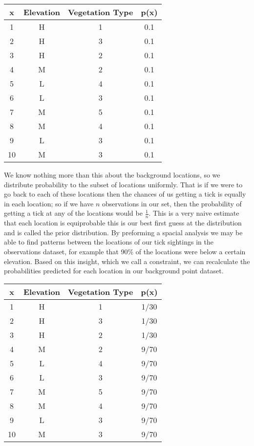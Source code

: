 \begin{center}
 \begin{tabular}{||c c c c||} 
 \hline
 x & Elevation & Vegetation Type & p(x) \\ [0.5ex] 
 \hline\hline
 1 & H &  1& 0.1  \\ 
 \hline
  2 & H & 3 & 0.1\\
 \hline
   3 & H & 2 & 0.1\\
 \hline
 4 & M & 2 & 0.1  \\
 \hline
  5 & L & 4 & 0.1 \\
 \hline
   6 & L & 3 & 0.1\\
 \hline
  7 & M & 5 & 0.1 \\
 \hline
   8 & M & 4 & 0.1\\
 \hline
 9 & L & 3 & 0.1 \\
 \hline
   10 & M & 3 & 0.1\\
 \hline
\end{tabular}
\end{center}




\noindent We know nothing more than this about the background locations, so we distribute probability to the subset of locations uniformly. That is if we were to go back to each of these locations then the chances of us getting a tick is equally in each location; so if we have $n$ observations in our set, then the probability of getting a tick at any of the locations would be $\frac{1}{n}$. This is a very naive estimate that each location is equiprobable this is our best first guess at the distribution and is called the prior distribution. By preforming a spacial analysis we may be able to find patterns between the locations of our tick sightings in the observations dataset, for example that 90\% of the locations were below a certain elevation. Based on this insight, which we call a constraint, we can recalculate the probabilities predicted for each location in our background point dataset. \newline

\begin{center}
 \begin{tabular}{||c c c c||} 
 \hline
 x & Elevation & Vegetation Type & p(x) \\ [0.5ex] 
 \hline\hline
 1 & H &  1& 1/30 \\ 
 \hline
  2 & H & 3 &  1/30\\
 \hline
   3 & H & 2 &  1/30\\
 \hline
 4 & M & 2 & 9/70  \\
 \hline
  5 & L & 4 & 9/70  \\
 \hline
   6 & L & 3 & 9/70 \\
 \hline
  7 & M & 5 & 9/70 \\
 \hline
   8 & M & 4 &  9/70 \\
 \hline
 9 & L & 3 & 9/70 \\
 \hline
   10 & M & 3 & 9/70\\
 \hline
\end{tabular}
\end{center}



